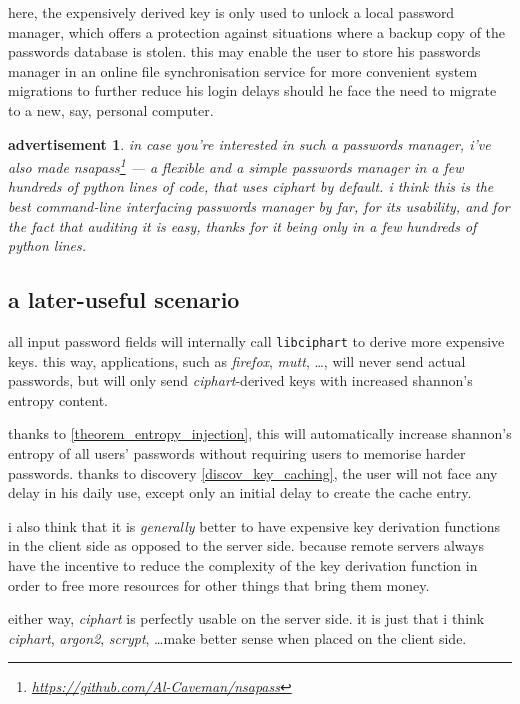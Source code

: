 \documentclass[twocolumn]{article}
\newtheorem{advertisement}{advertisement}
\begin{document}
here, the expensively derived key is only used to unlock a local password
manager, which offers a protection against situations where a backup copy
of the passwords database is stolen.  this may enable the user to store his
passwords manager in an online file synchronisation service for more
convenient system migrations to further reduce his login delays should he
face the need to migrate to a new, say, personal computer.

\begin{advertisement}
    in case you're interested in such a passwords manager, i've also made
    \emph{nsapass}\footnote{\url{https://github.com/Al-Caveman/nsapass}}
    --- a flexible and a simple passwords manager in a few hundreds of
    python lines of code, that uses \emph{ciphart} by default.  i think
    this is the best command-line interfacing passwords manager by far, for
    its usability, and for the fact that auditing it is easy, thanks for it
    being only in a few hundreds of python lines.
\end{advertisement}

\subsection{a later-useful scenario}
all input password fields will internally call \texttt{libciphart} to
derive more expensive keys.  this way, applications, such as
\emph{firefox}, \emph{mutt}, \ldots, will never send actual passwords, but
will only send \emph{ciphart}-derived keys with increased shannon's entropy
content.

thanks to \cref{theorem_entropy_injection}, this will automatically
increase shannon's entropy of all users' passwords without requiring users
to memorise harder passwords.  thanks to discovery
\ref{discov_key_caching}, the user will not face any delay in his daily
use, except only an initial delay to create the cache entry.

i also think that it is \emph{generally} better to have expensive key
derivation functions in the client side as opposed to the server side.
because remote servers always have the incentive to reduce the complexity
of the key derivation function in order to free more resources for other
things that bring them money.

either  way, \emph{ciphart} is perfectly usable on the server side.  it is
just that i think \emph{ciphart}, \emph{argon2}, \emph{scrypt}, \ldots make
better sense when placed on the client side.
\end{document}
